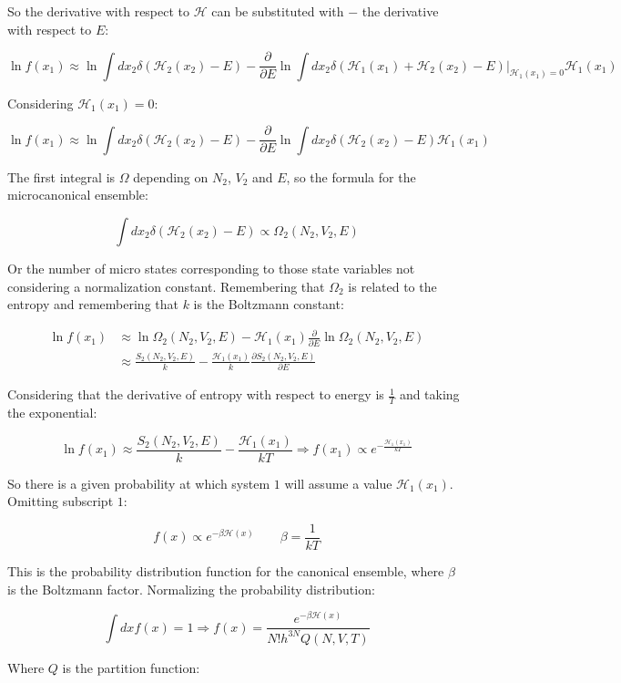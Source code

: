		So the derivative with respect to $\mathcal{H}$ can be substituted with $-$ the derivative with respect to $E$:

		$$\ln f(x_1) \approx\ln\int dx_2\delta(\mathcal{H}_2(x_2)-E) - \frac{\partial}{\partial E}\ln\int dx_2\delta(\mathcal{H}_1(x_1) + \mathcal{H}_2(x_2)-E)|_{\mathcal{H}_1(x_1) = 0}\mathcal{H}_1(x_1)$$

		Considering $\mathcal{H}_1(x_1) = 0$:

		$$\ln f(x_1) \approx\ln\int dx_2\delta(\mathcal{H}_2(x_2) - E)-\frac{\partial}{\partial E}\ln\int dx_2\delta(\mathcal{H}_2(x_2) - E)\mathcal{H}_1(x_1)$$

		The first integral is $\Omega$ depending on $N_2$, $V_2$ and $E$, so the formula for the microcanonical ensemble:

		$$\int dx_2\delta(\mathcal{H}_2(x_2) - E) \propto\Omega_2(N_2, V_2, E)$$

		Or the number of micro states corresponding to those state variables not considering a normalization constant.
		Remembering that $\Omega_2$ is related to the entropy and remembering that $k$ is the Boltzmann constant:

		\begin{align*}
			\ln f(x_1) &\approx\ln\Omega_2(N_2, V_2, E) - \mathcal{H}_1(x_1)\frac{\partial}{\partial E}\ln\Omega_2(N_2, V_2, E)\\
								 &\approx\frac{S_2(N_2, V_2, E)}{k}-\frac{\mathcal{H}_1(x_1)}{k}\frac{\partial S_2(N_2, V_2, E)}{\partial E}
		\end{align*}

		Considering that the derivative of entropy with respect to energy is $\frac{1}{T}$ and taking the exponential:

		$$\ln f(x_1)\approx \frac{S_2(N_2, V_2, E)}{k}-\frac{\mathcal{H}_1(x_1)}{kT}\Rightarrow f(x_1)\propto e^{-\frac{\mathcal{H}_1(x_1)}{kT}}$$

		So there is a given probability at which system $1$ will assume a value $\mathcal{H}_1(x_1)$.
		Omitting subscript $1$:

		$$f(x)\propto e^{-\beta\mathcal{H}(x)}\qquad \beta=\frac{1}{kT}$$

		This is the probability distribution function for the canonical ensemble, where $\beta$ is the Boltzmann factor.
		Normalizing the probability distribution:

		$$\int dxf(x) = 1\Rightarrow f(x) = \frac{e^{-\beta\mathcal{H}(x)}}{N!h^{3N}Q(N, V, T)}$$

		Where $Q$ is the partition function:

